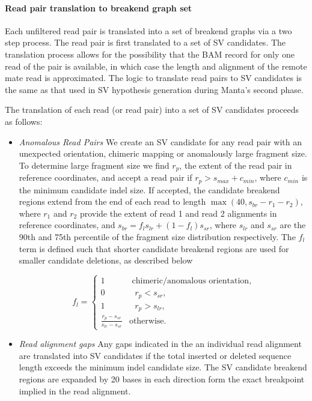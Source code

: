 \documentclass{article}
\begin{document}
\paragraph{Read pair translation to breakend graph set}
Each unfiltered read pair is translated into a set of breakend graphs via a two step process. The read pair is first translated to a set of SV candidates. The translation process allows for the possibility that the BAM record for only one read of the pair is available, in which case the length and alignment of the remote mate read is approximated. The logic to translate read pairs to SV candidates is the same as that used in SV hypothesis generation during Manta's second phase.

The translation of each read (or read pair) into a set of SV candidates proceeds as follows:
\begin{itemize}
\item \textit{Anomalous Read Pairs} We create an SV candidate for any read pair with an unexpected orientation, chimeric mapping or anomalously large fragment size. To determine large fragment size we find $r_p$, the extent of the read pair in reference coordinates, and accept a read pair if $r_p > s_{max} + c_{min}$, where $c_{min}$ is the minimum candidate indel size. If accepted, the candidate breakend regions extend from the end of each read to length $\max(40, s_{br} - r_1 - r_2)$, where $r_1$ and $r_2$ provide the extent of read 1 and read 2 alignments in reference coordinates, and $s_{br}  = f_l s_{lr} + (1 - f_l) s_{sr}$, where $s_{lr}$ and $s_{sr}$ are the 90th and 75th percentile of the fragment size distribution respectively. The $f_l$ term is defined such that shorter candidate breakend regions are used for smaller candidate deletions, as described below

\begin{equation*}
f_l =
\left\{
\begin{array}{cl}
1 & \mbox{ chimeric/anomalous orientation,} \\
0 & \mbox{ $r_p < s_{sr}$, } \\
1 & \mbox{ $r_p > s_{lr}$, } \\
\frac{r_p - s_{sr}} {s_{lr} - s_{sr}} & \mbox{otherwise.}
\end{array}
\right.
\end{equation*}

\item \textit{Read alignment gaps} Any gaps indicated in the an individual read alignment are translated into SV candidates if the total inserted or deleted sequence length exceeds the minimum indel candidate size. The SV candidate breakend regions are expanded by 20 bases in each direction form the exact breakpoint implied in the read alignment.


\end{itemize}
\end{document}
